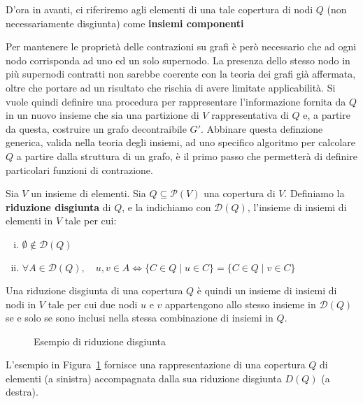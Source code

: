 D'ora in avanti, ci riferiremo agli elementi di una tale copertura di nodi $Q$ (non necessariamente disgiunta)
come \textbf{insiemi componenti} \newline

Per mantenere le proprietà delle contrazioni su grafi è però necessario che ad ogni nodo corrisponda ad uno ed un solo
supernodo.
La presenza dello stesso nodo in più supernodi contratti non sarebbe coerente con la teoria dei grafi
già affermata, oltre che portare ad un risultato che rischia di avere limitate applicabilità.
Si vuole quindi definire una procedura per rappresentare l'informazione fornita da $Q$ in un nuovo insieme che sia una
partizione di $V$ rappresentativa di $Q$ e, a partire da questa, costruire un grafo decontraibile $G'$.
Abbinare questa definzione generica, valida nella teoria degli insiemi, ad uno specifico algoritmo per calcolare
$Q$ a partire dalla struttura di un grafo, è il primo passo che permetterà di definire particolari funzioni di
contrazione.


\begin{definition}
Sia $V$ un insieme di elementi. Sia $Q \subseteq \mathcal{P}(V)$ una copertura di $V$.
Definiamo la \textbf{riduzione disgiunta} di $Q$, e la indichiamo con $\mathcal{D}(Q)$,
l'insieme di insiemi di elementi in $V$ tale per cui:
\begin{enumerate}[(i)]
    \item $\emptyset \notin \mathcal{D}(Q)$
    \item $\forall A \in \mathcal{D}(Q), \quad u, v \in A \Leftrightarrow \{C \in Q \mid u \in C\} = \{C \in Q \mid v \in C\}$
\end{enumerate}
\end{definition}

Una riduzione disgiunta di una copertura $Q$ è quindi un insieme di insiemi di nodi in $V$ tale per cui due
nodi $u$ e $v$ appartengono allo stesso insieme in $\mathcal{D}(Q)$ se e solo se sono inclusi nella stessa combinazione
di insiemi in $Q$. \newline

\begin{figure}[!h] \centering

\caption{Esempio di riduzione disgiunta}
\label{fig:disjoint_reduction_example}
\end{figure}

L'esempio in Figura~\ref{fig:disjoint_reduction_example} fornisce una rappresentazione di una copertura $Q$ di
elementi (a sinistra) accompagnata dalla sua riduzione disgiunta $D(Q)$ (a destra).

